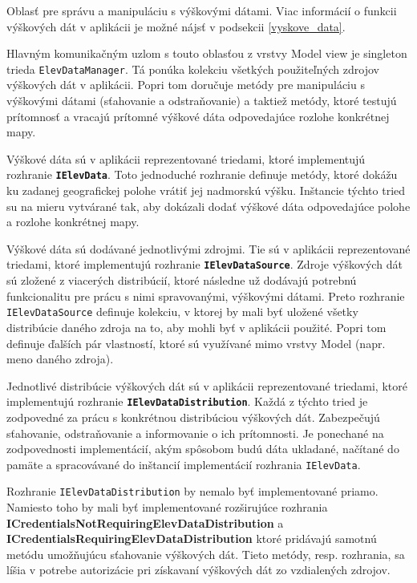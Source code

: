 Oblasť pre správu a manipuláciu s výškovými dátami. Viac informácií o funkcii výškových dát v aplikácii je možné nájsť v podsekcii \ref{vyskove_data}. 

Hlavným komunikačným uzlom s touto oblasťou z vrstvy Model view je singleton trieda \texttt{ElevDataManager}. Tá ponúka kolekciu všetkých použiteľných zdrojov výškových dát v aplikácii. Popri tom doručuje metódy pre manipuláciu s výškovými dátami (sťahovanie a odstraňovanie) a taktiež metódy, ktoré testujú prítomnosť a vracajú prítomné výškové dáta odpovedajúce rozlohe konkrétnej mapy.

\bigskip

Výškové dáta sú v aplikácii reprezentované triedami, ktoré implementujú rozhranie \textbf{\texttt{IElevData}}. Toto jednoduché rozhranie definuje metódy, ktoré dokážu ku zadanej geografickej polohe vrátiť jej nadmorskú výšku. Inštancie týchto tried su na mieru vytvárané tak, aby dokázali dodať výškové dáta odpovedajúce polohe a rozlohe konkrétnej mapy. 

Výškové dáta sú dodávané jednotlivými zdrojmi. Tie sú v aplikácii reprezentované triedami, ktoré implementujú rozhranie \textbf{\texttt{IElevDataSource}}. Zdroje výškových dát sú zložené z viacerých distribúcií, ktoré následne už dodávajú potrebnú funkcionalitu pre prácu s nimi spravovanými, výškovými dátami. Preto rozhranie \texttt{IElevDataSource} definuje kolekciu, v ktorej by mali byť uložené všetky distribúcie daného zdroja na to, aby mohli byť v aplikácii použité. Popri tom definuje ďalších pár vlastností, ktoré sú využívané mimo vrstvy Model (napr. meno daného zdroja).

Jednotlivé distribúcie výškových dát sú v aplikácii reprezentované triedami, ktoré implementujú rozhranie \textbf{\texttt{IElevDataDistribution}}. Každá z týchto tried je zodpovedné za prácu s konkrétnou distribúciou výškových dát. Zabezpečujú sťahovanie, odstraňovanie a informovanie o ich prítomnosti. Je ponechané na zodpovednosti implementácií, akým spôsobom budú dáta ukladané, načítané do pamäte a spracovávané do inštancií implementácií rozhrania \texttt{IElevData}.

Rozhranie \texttt{IElevDataDistribution} by nemalo byť implementované priamo. Namiesto toho by mali byť implementované rozširujúce rozhrania \textbf{ICredentialsNotRequiringElevDataDistribution} a \textbf{ICredentialsRequiringElevDataDistribution} ktoré pridávajú samotnú metódu umožňujúcu sťahovanie výškových dát. Tieto metódy, resp. rozhrania, sa líšia v potrebe autorizácie pri získavaní výškových dát zo vzdialených zdrojov.  

